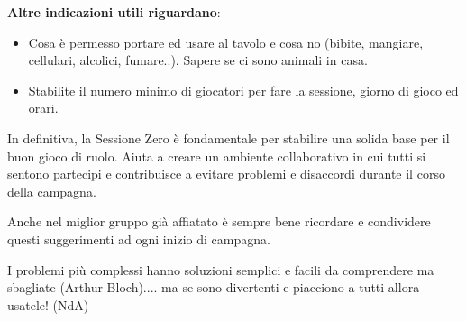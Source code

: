 \begin{multicols}{2}
\textbf{Altre indicazioni utili riguardano}:

\medskip

\begin{itemize}[leftmargin=*] \setlength{\itemsep}{0pt}
\item Cosa è permesso portare ed usare al tavolo e cosa no (bibite, mangiare, cellulari, alcolici, fumare..). Sapere se ci sono animali in casa.
\item Stabilite il numero minimo di giocatori per fare la sessione, giorno di gioco ed orari.
\end{itemize}

In definitiva, la Sessione Zero è fondamentale per stabilire una solida base per il buon gioco di ruolo. Aiuta a creare un ambiente collaborativo in cui tutti si sentono partecipi e contribuisce a evitare problemi e disaccordi durante il corso della campagna.

Anche nel miglior gruppo già affiatato è sempre bene ricordare e condividere questi suggerimenti ad ogni inizio di campagna.

\end{multicols}






\vfill

\begin{enfasi}
{
I problemi più complessi hanno soluzioni semplici e facili da comprendere ma sbagliate (Arthur Bloch).... ma se sono divertenti e piacciono a tutti allora usatele! (NdA)
}
\end{enfasi}


%

\pagebreak


